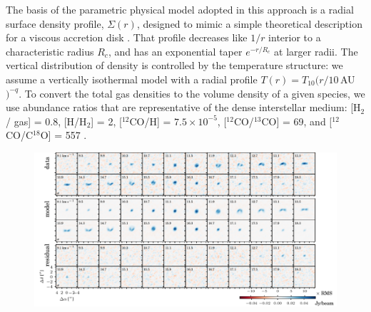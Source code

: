 \documentclass[twocolumn]{aastex61}
\begin{document}
The basis of the parametric physical model adopted in this approach is a radial surface density profile, $\Sigma(r)$, designed to mimic a simple theoretical description for a viscous accretion disk \citep{lyndenbell74,hartmann98}.  That profile decreases like $1/r$ interior to a characteristic radius $R_c$, and has an exponential taper $e^{-r/R_c}$ at larger radii.  The vertical distribution of density is controlled by the temperature structure: we assume a vertically isothermal model with a radial profile $T(r) = T_{10} (r/10$\,AU$)^{-q}$. To convert the total gas densities to the volume density of a given species, we use abundance ratios that are representative of the dense interstellar medium: [H$_2$/ gas] = 0.8, [H/H$_2$] = 2, [$^{12}$CO/H] = $7.5 \times 10^{-5}$, [$^{12}$CO/$^{13}$CO] = 69, and [$^{12}$CO/C$^{18}$O] = 557 \citep[e.g.,][]{henkel94,prantzos96}.

\begin{figure}[ht!]
\begin{center}
  \includegraphics{chmaps_C18O.pdf}
  \end{center}
\end{figure}
\end{document}
